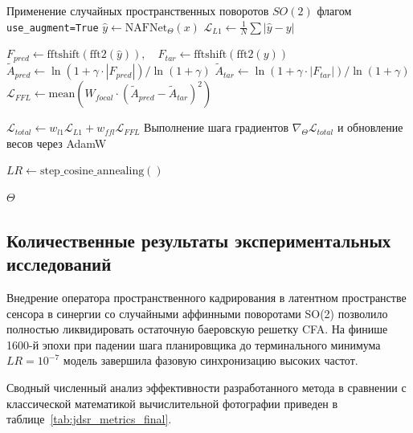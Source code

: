 \documentclass[12pt,a4paper,oneside]{article}
\begin{document}
\begin{algorithm}[H]
{{        \BlankLine
        Применение случайных пространственных поворотов $SO(2)$ флагом \texttt{use\_augment=True}\;
        $\hat{y} \leftarrow \text{NAFNet}_{\Theta}(x)$ 
        $\mathcal{L}_{L1} \leftarrow \frac{1}{N}\sum|\hat{y} - y|$\;
        
        \BlankLine
        $F_{pred} \leftarrow \text{fftshift}(\text{fft2}(\hat{y})), \quad F_{tar} \leftarrow \text{fftshift}(\text{fft2}(y))$\;
        $\tilde{A}_{pred} \leftarrow \ln(1 + \gamma \cdot |F_{pred}|) / \ln(1 + \gamma)$ 
        $\tilde{A}_{tar} \leftarrow \ln(1 + \gamma \cdot |F_{tar}|) / \ln(1 + \gamma)$\;
        $\mathcal{L}_{FFL} \leftarrow \text{mean}(W_{focal} \cdot (\tilde{A}_{pred} - \tilde{A}_{tar})^2)$\;
        
        \BlankLine
        $\mathcal{L}_{total} \leftarrow w_{l1}\mathcal{L}_{L1} + w_{ffl}\mathcal{L}_{FFL}$\;
        Выполнение шага градиентов $\nabla_{\Theta}\mathcal{L}_{total}$ и обновление весов через AdamW\;
    }
    $LR \leftarrow \text{step\_cosine\_annealing}()$\;
}
\KwRet $\Theta$\;
\end{algorithm}

\subsection{Количественные результаты экспериментальных исследований}

Внедрение оператора пространственного кадрирования в латентном пространстве сенсора в синергии со случайными аффинными поворотами SO(2) позволило полностью ликвидировать остаточную баеровскую решетку CFA. На финише 1600-й эпохи при падении шага планировщика до терминального минимума $LR = 10^{-7}$ модель завершила фазовую синхронизацию высоких частот.

Сводный численный анализ эффективности разработанного метода в сравнении с классической математикой вычислительной фотографии приведен в таблице~\ref{tab:jdsr_metrics_final}.
\end{document}
